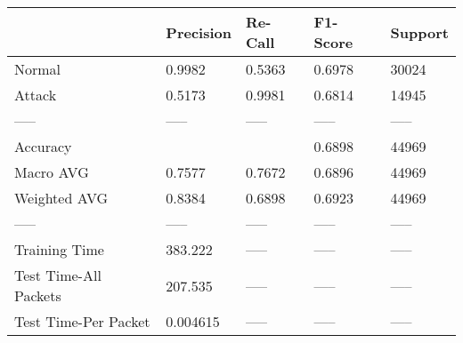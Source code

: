 \begin{tabular}{lllll}
\toprule
{} & Precision & Re-Call & F1-Score & Support \\
\midrule
Normal                &    0.9982 &  0.5363 &   0.6978 &   30024 \\
Attack                &    0.5173 &  0.9981 &   0.6814 &   14945 \\
-----                 &     ----- &   ----- &    ----- &   ----- \\
Accuracy              &           &         &   0.6898 &   44969 \\
Macro AVG             &    0.7577 &  0.7672 &   0.6896 &   44969 \\
Weighted AVG          &    0.8384 &  0.6898 &   0.6923 &   44969 \\
-----                 &     ----- &   ----- &    ----- &   ----- \\
Training Time         &   383.222 &   ----- &    ----- &   ----- \\
Test Time-All Packets &   207.535 &   ----- &    ----- &   ----- \\
Test Time-Per Packet  &  0.004615 &   ----- &    ----- &   ----- \\
\bottomrule
\end{tabular}
